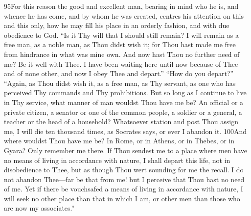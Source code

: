 95For this reason the good and excellent man, bearing in mind who he is, and whence he has come, and by whom he was created, centres his attention on this and this only, how he may fill his place in an orderly fashion, and with due obedience to God. ``Is it Thy will that I should still remain? I will remain as a free man, as a noble man, as Thou didst wish it; for Thou hast made me free from hindrance in what was mine own. And now hast Thou no further need of me? Be it well with Thee. I have been waiting here until now because of Thee and of none other, and now I obey Thee and depart.'' ``How do you depart?'' ``Again, as Thou didst wish it, as a free man, as Thy servant, as one who has perceived Thy commands and Thy prohibitions. But so long as I continue to live in Thy service, what manner of man wouldst Thou have me be? An official or a private citizen, a senator or one of the common people, a soldier or a general, a teacher or the head of a household? Whatsoever station and post Thou assign me, I will die ten thousand times, as Socrates says, or ever I abandon it. 100And where wouldst Thou have me be? In Rome, or in Athens, or in Thebes, or in Gyara? Only remember me there. If Thou sendest me to a place where men have no means of living in accordance with nature, I shall depart this life, not in disobedience to Thee, but as though Thou wert sounding for me the recall. I do not abandon Thee—far be that from me! but I perceive that Thou hast no need of me. Yet if there be vouchsafed a means of living in accordance with nature, I will seek no other place than that in which I am, or other men than those who are now my associates.''

